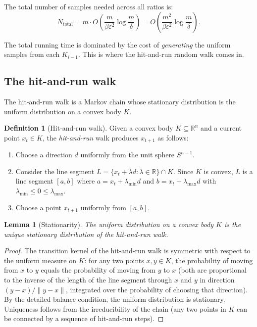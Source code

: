 \documentclass[twoside,12pt]{book}
\theoremstyle{plain}
\newtheorem{lemma}[theorem]{Lemma}
\theoremstyle{definition}
\newtheorem{definition}[theorem]{Definition}
\theoremstyle{remark}
\begin{document}
The total number of samples needed across all ratios is:
\[
N_{\text{total}} = m \cdot O\!\left(\frac{m}{\beta \varepsilon^2} \log \frac{m}{\delta}\right) = O\!\left(\frac{m^2}{\beta \varepsilon^2} \log \frac{m}{\delta}\right).
\]

The total running time is dominated by the cost of \emph{generating} the uniform samples from each $K_{i-1}$. This is where the hit-and-run random walk comes in.

\subsection{The hit-and-run walk}

The hit-and-run walk is a Markov chain whose stationary distribution is the uniform distribution on a convex body $K$.

\begin{definition}[Hit-and-run walk]
Given a convex body $K \subseteq \mathbb{R}^n$ and a current point $x_t \in K$, the \emph{hit-and-run} walk produces $x_{t+1}$ as follows:
\begin{enumerate}[nosep]
    \item Choose a direction $d$ uniformly from the unit sphere $S^{n-1}$.
    \item Consider the line segment $L = \{x_t + \lambda d : \lambda \in \mathbb{R}\} \cap K$. Since $K$ is convex, $L$ is a line segment $[a, b]$ where $a = x_t + \lambda_{\min} d$ and $b = x_t + \lambda_{\max} d$ with $\lambda_{\min} \leq 0 \leq \lambda_{\max}$.
    \item Choose a point $x_{t+1}$ uniformly from $[a, b]$.
\end{enumerate}
\end{definition}

\begin{lemma}[Stationarity]
The uniform distribution on a convex body $K$ is the unique stationary distribution of the hit-and-run walk.
\end{lemma}

\begin{proof}
The transition kernel of the hit-and-run walk is symmetric with respect to the uniform measure on $K$: for any two points $x, y \in K$, the probability of moving from $x$ to $y$ equals the probability of moving from $y$ to $x$ (both are proportional to the inverse of the length of the line segment through $x$ and $y$ in direction $(y - x)/\|y - x\|$, integrated over the probability of choosing that direction). By the detailed balance condition, the uniform distribution is stationary. Uniqueness follows from the irreducibility of the chain (any two points in $K$ can be connected by a sequence of hit-and-run steps).
\end{proof}
\end{document}
